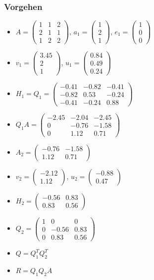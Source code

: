 \documentclass[8pt,a4paper]{scrartcl}
\begin{document}
\begin{multicols*}{3}
			\subsubsection{Vorgehen}
				\begin{itemize}\itemsep0pt	
					\item $A=\begin{pmatrix}1&1&2\\2&1&1\\1&2&2\end{pmatrix}$, $a_{1}=\begin{pmatrix}1\\2\\1\end{pmatrix}$, $e_{1}=\begin{pmatrix}1\\0\\0\end{pmatrix}$
					\item $v_{1} = \begin{pmatrix}3.45\\2\\1\end{pmatrix}$, $u_{1} = \begin{pmatrix}0.84\\0.49\\0.24\end{pmatrix}$
					\item $H_{1} = Q_{1} = \begin{pmatrix}-0.41&-0.82&-0.41\\-0.82&0.53&-0.24\\-0.41&-0.24&0.88\end{pmatrix}$
					\item $Q_{1}A= \begin{pmatrix}-2.45&-2.04&-2.45\\0&-0.76&-1.58\\0&1.12&0.71\end{pmatrix}$
					\item $ A_{2} = \begin{pmatrix}-0.76&-1.58\\1.12&0.71\end{pmatrix}$
					\item $v_{2} = \begin{pmatrix}-2.12\\1.12\end{pmatrix}$, $u_{2} = \begin{pmatrix}-0.88\\0.47\end{pmatrix}$
					\item $H_{2} = \begin{pmatrix}-0.56&0.83\\0.83&0.56\end{pmatrix}$
					\item $Q_{2} = \begin{pmatrix}1&0&0\\0&-0.56&0.83\\0&0.83&0.56\end{pmatrix}$
					\item $Q= Q_{1}^{T} Q_{2}^{T}$
					\item $R= Q_{1}Q_{2}A$
					

\end{itemize}
\end{multicols*}
\end{document}
